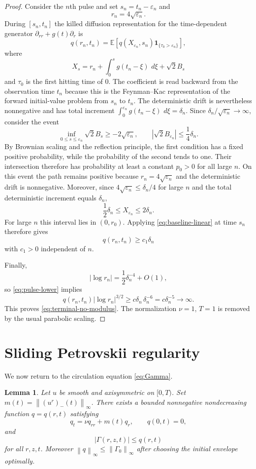 \documentclass[11pt]{article}
\numberwithin{equation}{section}
\newtheorem{lemma}[lemma]{Lemma}
\theoremstyle{definition}
\newcommand{\dd}{\,d}
\newcommand{\Gam}{\Gamma}
\newcommand{\norm}[1]{\left\lVert #1\right\rVert}
\begin{document}
\begin{proof}
Consider the $n$th pulse and set $s_n=t_n-\varepsilon_n$ and
\[
 r_n=4\sqrt{\varepsilon_n}.
\]
During $[s_n,t_n]$ the killed diffusion representation for the time-dependent generator $\partial_{rr}+g(t)\partial_r$ is
\[
 q(r_n,t_n)=
 \mathbb E\left[q(X_{\varepsilon_n},s_n)
 \mathbf 1_{\{\tau_0>\varepsilon_n\}}\right],
\]
where
\[
 X_s=r_n+\int_0^s g(t_n-\xi)\,\dd\xi+\sqrt2 B_s
\]
and $\tau_0$ is the first hitting time of $0$.  The coefficient is read backward from the observation time $t_n$ because this is the Feynman--Kac representation of the forward initial-value problem from $s_n$ to $t_n$.  The deterministic drift is nevertheless nonnegative and has total increment
$\int_0^{\varepsilon_n}g(t_n-\xi)\,\dd\xi=\delta_n$.  Since $\delta_n/\sqrt{\varepsilon_n}\to\infty$, consider the event
\[
 \inf_{0\le s\le\varepsilon_n}\sqrt2B_s\ge-2\sqrt{\varepsilon_n},
 \qquad
 |\sqrt2B_{\varepsilon_n}|\le\frac14\delta_n.
\]
By Brownian scaling and the reflection principle, the first condition has a fixed positive probability, while the probability of the second tends to one.  Their intersection therefore has probability at least a constant $p_0>0$ for all large $n$.  On this event the path remains positive because $r_n=4\sqrt{\varepsilon_n}$ and the deterministic drift is nonnegative.  Moreover, since $4\sqrt{\varepsilon_n}\le\delta_n/4$ for large $n$ and the total deterministic increment equals $\delta_n$,
\[
 \frac12\delta_n\le X_{\varepsilon_n}\le2\delta_n.
\]
For large $n$ this interval lies in $(0,r_0)$.  Applying \eqref{eq:baseline-linear} at time $s_n$ therefore gives
\begin{equation}\label{eq:pulse-lower}
 q(r_n,t_n)\ge c_1\delta_n
\end{equation}
with $c_1>0$ independent of $n$.

Finally,
\[
 |\log r_n|=\frac12\delta_n^{-4}+O(1),
\]
so \eqref{eq:pulse-lower} implies
\[
 q(r_n,t_n)|\log r_n|^{3/2}
 \ge c\delta_n\,\delta_n^{-6}
 =c\delta_n^{-5}\longrightarrow\infty.
\]
This proves \eqref{eq:terminal-no-modulus}.  The normalization $\nu=1$, $T=1$ is removed by the usual parabolic scaling.
\end{proof}

\section{Sliding Petrovskii regularity}

We now return to the circulation equation \eqref{eq:Gamma}.

\begin{lemma}\label{lem:comparison}
Let $u$ be smooth and axisymmetric on $[0,T)$.  Set $m(t)=\norm{(u^r)_-(t)}_\infty$.  There exists a bounded nonnegative nondecreasing function $q=q(r,t)$ satisfying
\begin{equation}\label{eq:qcomp}
 q_t=\nu q_{rr}+m(t)q_r,
 \qquad q(0,t)=0,
\end{equation}
and
\begin{equation}\label{eq:GammaComp}
 |\Gam(r,z,t)|\le q(r,t)
\end{equation}
for all $r,z,t$.  Moreover $\norm{q}_\infty\le\norm{\Gam_0}_\infty$ after choosing the initial envelope optimally.
\end{lemma}
\end{document}
